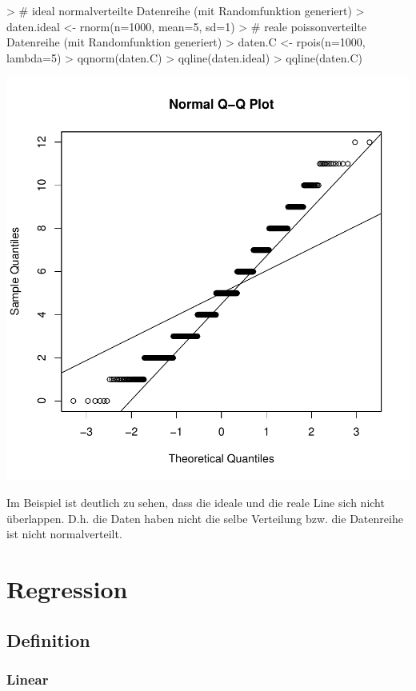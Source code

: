 \begin{Schunk}
\begin{Sinput}
> # ideal normalverteilte Datenreihe (mit Randomfunktion generiert)
> daten.ideal <- rnorm(n=1000, mean=5, sd=1)
> # reale poissonverteilte Datenreihe (mit Randomfunktion generiert)
> daten.C <- rpois(n=1000, lambda=5)
> qqnorm(daten.C)
> qqline(daten.ideal)
> qqline(daten.C)
\end{Sinput}
\end{Schunk}
\includegraphics{definitionen-030}

\noindent
Im Beispiel ist deutlich zu sehen, dass die ideale und die reale Line 
sich nicht überlappen. D.h. die Daten haben nicht die selbe Verteilung
bzw. die Datenreihe ist nicht normalverteilt.


\section{Regression}

\subsection{Definition}

\subsubsection{Linear}

